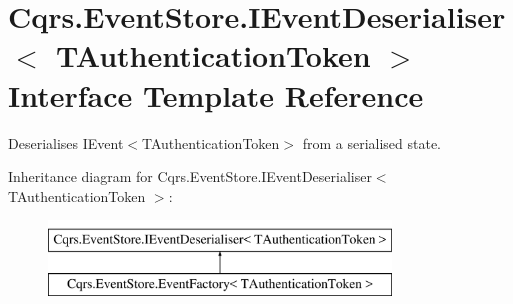 \hypertarget{interfaceCqrs_1_1EventStore_1_1IEventDeserialiser}{}\section{Cqrs.\+Event\+Store.\+I\+Event\+Deserialiser$<$ T\+Authentication\+Token $>$ Interface Template Reference}
\label{interfaceCqrs_1_1EventStore_1_1IEventDeserialiser}


Deserialises I\+Event$<$\+T\+Authentication\+Token$>$ from a serialised state.  


Inheritance diagram for Cqrs.\+Event\+Store.\+I\+Event\+Deserialiser$<$ T\+Authentication\+Token $>$\+:\begin{figure}[H]
\begin{center}
\leavevmode
\includegraphics[height=2.000000cm]{interfaceCqrs_1_1EventStore_1_1IEventDeserialiser}
\end{center}
\end{figure}
